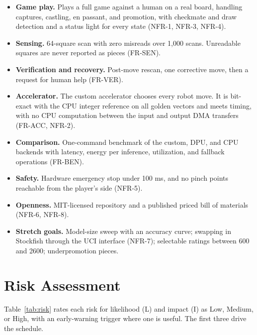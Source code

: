 \documentclass[10pt]{article}
\newcommand{\lead}[1]{\textbf{#1}}
\begin{document}
\begin{itemize}
\item \lead{Game play.} Plays a full game against a human on a real board, handling captures,
  castling, en passant, and promotion, with checkmate and draw detection and a status light for
  every state (NFR-1, NFR-3, NFR-4).
\item \lead{Sensing.} 64-square scan with zero misreads over 1,000 scans. Unreadable squares are
  never reported as pieces (FR-SEN).
\item \lead{Verification and recovery.} Post-move rescan, one corrective move, then a request for
  human help (FR-VER).
\item \lead{Accelerator.} The custom accelerator chooses every robot move. It is bit-exact with the
  CPU integer reference on all golden vectors and meets timing, with no CPU computation between the
  input and output DMA transfers (FR-ACC, NFR-2).
\item \lead{Comparison.} One-command benchmark of the custom, DPU, and CPU backends with latency,
  energy per inference, utilization, and fallback operations (FR-BEN).
\item \lead{Safety.} Hardware emergency stop under 100 ms, and no pinch points reachable from the
  player's side (NFR-5).
\item \lead{Openness.} MIT-licensed repository and a published priced bill of materials (NFR-6,
  NFR-8).
\item \lead{Stretch goals.} Model-size sweep with an accuracy curve; swapping in Stockfish through
  the UCI interface (NFR-7); selectable ratings between 600 and 2600; underpromotion pieces.
\end{itemize}

\section{Risk Assessment}

Table~\ref{tab:risk} rates each risk for likelihood (L) and impact (I) as Low, Medium, or High,
with an early-warning trigger where one is useful. The first three drive the schedule.
\end{document}
